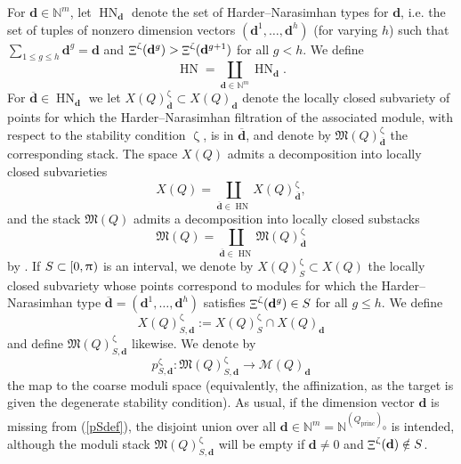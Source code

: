 \documentclass[a4paper,10pt]{amsart}
\newcommand{\dd}{\mathbf{d}}
\DeclareMathOperator{\HN}{HN}
\newcommand{\Mst}{\mathfrak{M}}
\newcommand{\Msp}{\mathcal{M}}
\renewcommand{\zeta}{\upzeta}
\renewcommand{\pi}{\uppi\hspace{0.05em}}
\DeclareMathOperator{\Mu}{\Upxi}
\DeclareMathOperator{\princ}{princ}
\begin{document}
For $\dd\in\mathbb{N}^{m}$, let $\HN_{\dd}$ denote the set of Harder--Narasimhan types for $\dd$, i.e. the set of tuples of nonzero dimension vectors $(\dd^1,\ldots,\dd^h)$ (for varying $h$) such that $\sum_{1\leq g\leq h} \dd^g=\dd$ and $\Mu^{\zeta}(\dd^g)>\Mu^{\zeta}(\dd^{g+1})$ for all $g<h$.  We define
\[
\HN=\coprod_{\dd\in\mathbb{N}^{m}}\HN_\dd.
\]
For $\overline{\dd}\in \HN_{\dd}$ we let $X(Q)_{\overline{\dd}}^{\zeta}\subset X(Q)_{\dd}$ denote the locally closed subvariety of points for which the Harder--Narasimhan filtration of the associated module, with respect to the stability condition $\zeta$, is in $\overline{\dd}$, and denote by $\Mst(Q)^{\zeta}_{\overline{\dd}}$ the corresponding stack.  The space $X(Q)$ admits a decomposition into locally closed subvarieties
\[
X(Q)=\coprod_{\overline{\dd}\in\HN}X(Q)^{\zeta}_{\overline{\dd}},
\]
and the stack $\Mst(Q)$ admits a decomposition into locally closed substacks
\[
\Mst(Q)= \coprod_{\overline{\dd}\in\HN}\Mst(Q)^{\zeta}_{\overline{\dd}}
\]
by \cite[Prop.3.4]{Reineke_HN}.  If $S\subset [0,\pi)$ is an interval, we denote by $X(Q)^{\zeta}_S\subset X(Q)$ the locally closed subvariety whose points correspond to modules for which the Harder--Narasimhan type $\overline{\dd}=(\dd^1,\ldots,\dd^h)$ satisfies $\Mu^{\zeta}(\dd^g)\in S$ for all $g\leq h$.  We define 
\[
X(Q)^{\zeta}_{S,\dd}:=X(Q)^{\zeta}_S\cap X(Q)_\dd
\]
and define $\Mst(Q)^{\zeta}_{S,\dd}$ likewise.  We denote by
\begin{equation}
\label{pSdef}
p^{\zeta}_{S,\dd}\colon \Mst(Q)_{S,\dd}^{\zeta}\rightarrow\Msp(Q)_{\dd}
\end{equation}
the map to the coarse moduli space (equivalently, the affinization, as the target is given the degenerate stability condition).  As usual, if the dimension vector $\dd$ is missing from (\ref{pSdef}), the disjoint union over all $\dd\in\mathbb{N}^m=\mathbb{N}^{(Q_{\princ})_0}$ is intended, although the moduli stack $\Mst(Q)^{\zeta}_{S,\dd}$ will be empty if $\dd\neq 0$ and $\Mu^{\zeta}(\dd)\notin S$.
\end{document}
